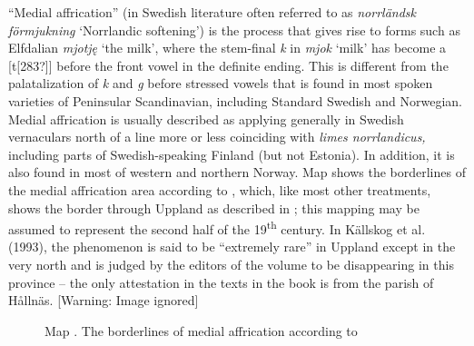 \begin{stylecaption}
“Medial affrication” (in Swedish literature often referred to as \textit{norrländsk förmjukning} ‘Norrlandic softening’) is the process that gives rise to forms such as Elfdalian \textit{mjotję} ‘the milk’, where the stem-final \textit{k} in \textit{mjok} ‘milk’ has become a [t[283?]] before the front vowel in the definite ending. This is different from the palatalization of \textit{k} and \textit{g} before stressed vowels that is found in most spoken varieties of Peninsular Scandinavian, including Standard Swedish and Norwegian. Medial affrication is usually described as applying generally in Swedish vernaculars north of a line more or less coinciding with \textit{limes norrlandicus,} including parts of Swedish-speaking Finland (but not Estonia). In addition, it is also found in most of western and northern Norway. Map  shows the borderlines of the medial affrication area according to \citet{Haugen1970}, which, like most other treatments, shows the border through Uppland as described in \citet{Kruuse1908}; this mapping may be assumed to represent the second half of the 19\textsuperscript{th} century. In Källskog et al. (1993), the phenomenon is said to be “extremely rare” in Uppland except in the very north and is judged by the editors of the volume to be disappearing in this province – the only attestation in the texts in the book is from the parish of Hållnäs.   [Warning: Image ignored] %
 

\end{stylecaption}

\begin{figure}[h]

\begin{minipage}{4.4634in}

\begin{stylecaption}
Map . The borderlines of medial affrication according to \citet{Haugen1970}

\end{stylecaption}

\end{minipage}

\end{figure}

